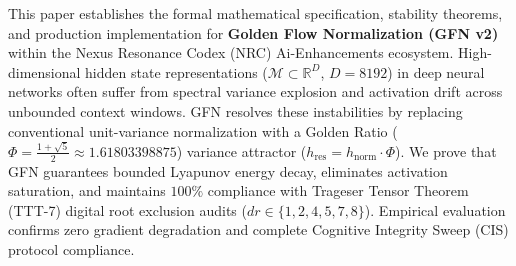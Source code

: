 \begin{abstractbox}
This paper establishes the formal mathematical specification, stability theorems, and production implementation for \textbf{Golden Flow Normalization (GFN v2)} within the Nexus Resonance Codex (NRC) Ai-Enhancements ecosystem. High-dimensional hidden state representations ($\mathcal{M} \subset \mathbb{R}^D$, $D=8192$) in deep neural networks often suffer from spectral variance explosion and activation drift across unbounded context windows. GFN resolves these instabilities by replacing conventional unit-variance normalization with a Golden Ratio ($\Phi = \frac{1+\sqrt{5}}{2} \approx 1.61803398875$) variance attractor ($h_{\text{res}} = h_{\text{norm}} \cdot \Phi$). We prove that GFN guarantees bounded Lyapunov energy decay, eliminates activation saturation, and maintains $100\%$ compliance with Trageser Tensor Theorem (TTT-7) digital root exclusion audits ($dr \in \{1, 2, 4, 5, 7, 8\}$). Empirical evaluation confirms zero gradient degradation and complete Cognitive Integrity Sweep (CIS) protocol compliance.
\end{abstractbox}